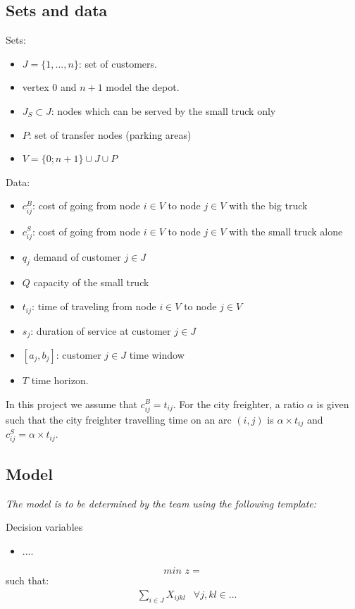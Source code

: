 \documentclass[dvipsnames,authoryear,11pt]{article}
\begin{document}
	\subsection{Sets and data}
	Sets: 
	\begin{itemize}
		\item $J=\{1,...,n\}$: set of customers.
		\item vertex $0$ and $n+1$ model the depot.
		\item $J_S \subset J$: nodes which can be served by the small truck only
		\item $P$: set of transfer nodes (parking areas)
		\item $V=\{0;n+1\} \cup J \cup P$
	\end{itemize}

	Data:
	\begin{itemize}
		\item $c_{ij}^B$: cost of going from node $i\in V$ to node $j \in V$ with the big truck
		\item $c_{ij}^S$: cost of going from node $i\in V$ to node $j \in V$ with the small truck alone
		\item $q_j$ demand of customer $j\in J$
		\item $Q$ capacity of the small truck
		\item $t_{ij}$: time of traveling from node $i\in V$ to node $j \in V$
		\item $s_j$: duration of service at customer $j\in J$
		\item $[a_j,b_j]$: customer $j\in J$ time window
		\item $T$ time horizon.
	\end{itemize}

In this project we assume that $c_{ij}^B=t_{ij}$.
For the city freighter, a ratio $\alpha$ is given such that the city freighter travelling time on an arc $(i,j)$ is $\alpha \times t_{ij}$ and $c_{ij}^S=\alpha \times t_{ij}$. 

	
\subsection{Model}	

\textit{The model is to be determined by the team using the following template:}
	
Decision variables 
	\begin{itemize}
		\item ....
	\end{itemize}

	
	$$\textit{min }z=  \label{obj}$$
	such that:
	\begin{align}
		&\sum_{i \in J } X_{ijkl}& \forall j, k l \in ... \label{cte:cte1}\\
	\end{align}
	
\end{document}
